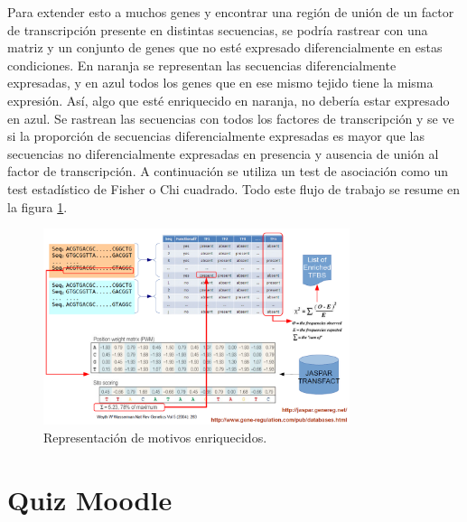 Para extender esto a muchos genes y encontrar una región de unión de un factor de transcripción presente en distintas secuencias, se podría rastrear con una matriz y un conjunto de genes que no esté expresado diferencialmente en estas condiciones.
En naranja se representan las secuencias diferencialmente expresadas, y en azul todos los genes que en ese mismo tejido tiene la misma expresión. Así, algo que esté enriquecido en naranja, no debería estar expresado en azul. Se rastrean las secuencias con todos los factores de transcripción y se ve si la proporción de secuencias diferencialmente expresadas es mayor que las secuencias no diferencialmente expresadas en presencia y ausencia de unión al factor de transcripción. A continuación se utiliza un test de asociación como un test estadístico de Fisher o Chi cuadrado. Todo este flujo de trabajo se resume en la figura \ref{fig:enrichment}.

\begin{figure}[htbp]
\centering
\includegraphics[width = 0.8\textwidth]{figs/motivos-enriquecidos.png}
\caption{Representación de motivos enriquecidos.}
\label{fig:enrichment}
\end{figure}

\section{Quiz Moodle}
